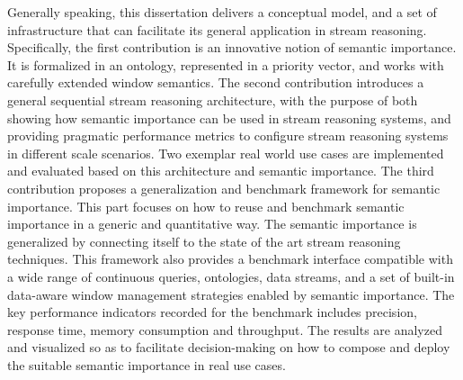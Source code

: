 Generally speaking, this dissertation delivers a conceptual model, and a set of infrastructure that can facilitate its general application in stream reasoning. 
Specifically, the first contribution is an innovative notion of semantic importance.
It is formalized in an ontology, represented in a priority vector, and works with carefully extended window semantics. 
The second contribution introduces a general sequential stream reasoning architecture, with the purpose of both showing how semantic importance can be used in stream reasoning systems, and providing pragmatic performance metrics to configure stream reasoning systems in different scale scenarios. 
Two exemplar real world use cases are implemented and evaluated based on this architecture and semantic importance.
The third contribution proposes a generalization and benchmark framework for semantic importance. 
This part focuses on how to reuse and benchmark semantic importance in a generic and quantitative way.
The semantic importance is generalized by connecting itself to the state of the art stream reasoning techniques. 
This framework also provides a benchmark interface compatible with a wide range of continuous queries, ontologies, data streams, and a set of built-in data-aware window management strategies enabled by semantic importance. 
The key performance indicators recorded for the benchmark includes precision, response time, memory consumption and throughput. 
The results are analyzed and visualized so as to facilitate decision-making on how to compose and deploy the suitable semantic importance in real use cases. 